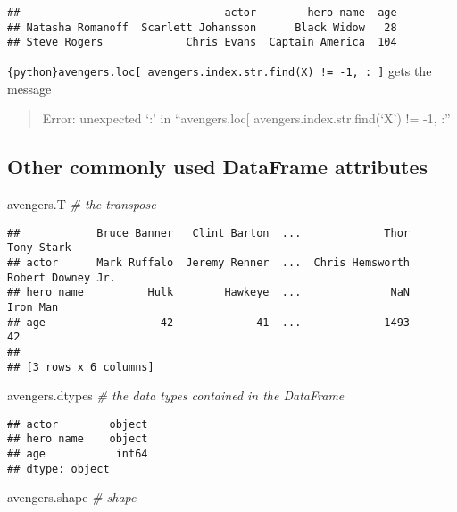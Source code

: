 \documentclass[
]{book}
\newenvironment{Shaded}{\begin{snugshade}}{\end{snugshade}}
\newcommand{\CommentTok}[1]{\textcolor[rgb]{0.56,0.35,0.01}{\textit{#1}}}
\newcommand{\NormalTok}[1]{#1}
\begin{document}
\begin{verbatim}
##                                actor        hero name  age
## Natasha Romanoff  Scarlett Johansson      Black Widow   28
## Steve Rogers             Chris Evans  Captain America  104
\end{verbatim}

\texttt{\{python\}avengers.loc{[}\ avengers.index.str.find(\textquotesingle{}X\textquotesingle{})\ !=\ -1,\ :\ {]}} gets the message

\begin{quote}
Error: unexpected `:' in ``avengers.loc{[} avengers.index.str.find(`X') != -1, :''
\end{quote}

\hypertarget{other-commonly-used-dataframe-attributes}{%
\subsection{Other commonly used DataFrame attributes}\label{other-commonly-used-dataframe-attributes}}

\begin{Shaded}
\begin{Highlighting}[]
\NormalTok{avengers.T }\CommentTok{\# the transpose}
\end{Highlighting}
\end{Shaded}

\begin{verbatim}
##            Bruce Banner   Clint Barton  ...             Thor         Tony Stark
## actor      Mark Ruffalo  Jeremy Renner  ...  Chris Hemsworth  Robert Downey Jr.
## hero name          Hulk        Hawkeye  ...              NaN           Iron Man
## age                  42             41  ...             1493                 42
## 
## [3 rows x 6 columns]
\end{verbatim}

\begin{Shaded}
\begin{Highlighting}[]
\NormalTok{avengers.dtypes }\CommentTok{\# the data types contained in the DataFrame}
\end{Highlighting}
\end{Shaded}

\begin{verbatim}
## actor        object
## hero name    object
## age           int64
## dtype: object
\end{verbatim}

\begin{Shaded}
\begin{Highlighting}[]
\NormalTok{avengers.shape }\CommentTok{\# shape}
\end{Highlighting}
\end{Shaded}
\end{document}
